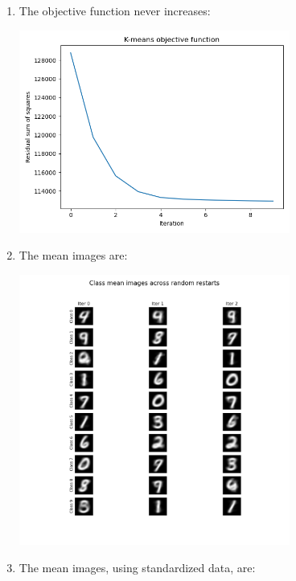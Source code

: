 \documentclass[submit]{harvardml}
\begin{document}
\begin{enumerate}
	\item The objective function never increases:
	
	\begin{center}
		\includegraphics[width=0.7\textwidth]{kmeans_obj}
	\end{center}

	\item The mean images are:

	\begin{center}
		\includegraphics[width=0.7\textwidth]{kmeans}
	\end{center}

	\item The mean images, using standardized data, are:


\end{enumerate}
\end{document}
